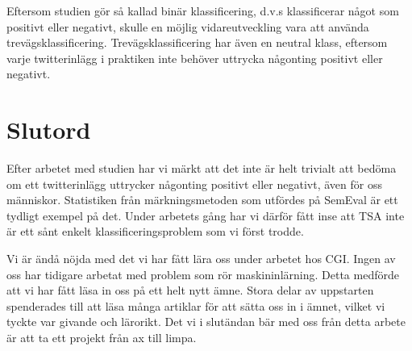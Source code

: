 \documentclass{kaumasters} %
\begin{document}
Eftersom studien gör så kallad binär klassificering, d.v.s klassificerar något som positivt eller negativt, skulle en möjlig vidareutveckling vara att använda trevägsklassificering. Trevägsklassificering har även en neutral klass, eftersom varje twitterinlägg i praktiken inte behöver uttrycka någonting positivt eller negativt. 
\section{Slutord}
Efter arbetet med studien har vi märkt att det inte är helt trivialt att bedöma om ett twitterinlägg uttrycker någonting positivt eller negativt, även för oss människor. Statistiken från märkningsmetoden som utfördes på SemEval är ett tydligt exempel på det. Under arbetets gång har vi därför fått inse att TSA inte är ett sånt enkelt klassificeringsproblem som vi först trodde. 

Vi är ändå nöjda med det vi har fått lära oss under arbetet hos CGI. Ingen av oss har tidigare arbetat med problem som rör maskininlärning. Detta medförde att vi har fått läsa in 
oss på ett helt nytt ämne. Stora delar av uppstarten spenderades till att läsa många artiklar för att sätta oss in i ämnet, vilket vi tyckte var givande och lärorikt. Det vi i slutändan bär med oss från detta arbete är att ta ett projekt från ax till limpa. 

 



\restoregeometry%
\end{document}
